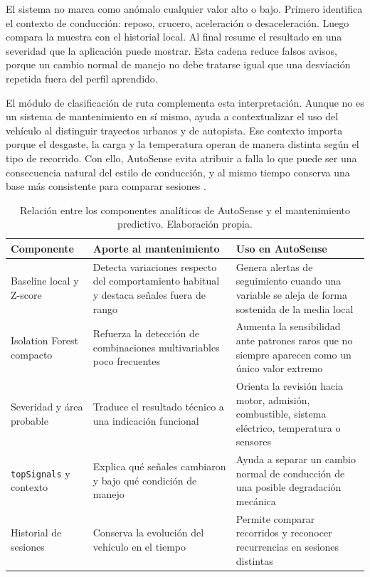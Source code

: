 \documentclass[12pt,letterpaper]{report}
\begin{document}
El sistema no marca como anómalo cualquier valor alto o bajo. Primero identifica el contexto de conducción: reposo, crucero, aceleración o desaceleración. Luego compara la muestra con el historial local. Al final resume el resultado en una severidad que la aplicación puede mostrar. Esta cadena reduce falsos avisos, porque un cambio normal de manejo no debe tratarse igual que una desviación repetida fuera del perfil aprendido.

El módulo de clasificación de ruta complementa esta interpretación. Aunque no es un sistema de mantenimiento en sí mismo, ayuda a contextualizar el uso del vehículo al distinguir trayectos urbanos y de autopista. Ese contexto importa porque el desgaste, la carga y la temperatura operan de manera distinta según el tipo de recorrido. Con ello, AutoSense evita atribuir a falla lo que puede ser una consecuencia natural del estilo de conducción, y al mismo tiempo conserva una base más consistente para comparar sesiones \cite{camposferreira2023_vehicle_driver_monitoring}.

\begin{table}[!htbp]
    \centering
    \caption{Relación entre los componentes analíticos de AutoSense y el mantenimiento predictivo. Elaboración propia.}
    \label{tab:autosense-predictive-maintenance}
    \renewcommand{\arraystretch}{1.08}
    \setlength{\tabcolsep}{4pt}
    \small
    \begin{tabular}{p{}p{}p{}}
    \toprule
    Componente & Aporte al mantenimiento & Uso en AutoSense \\
    \midrule
    Baseline local y Z-score & Detecta variaciones respecto del comportamiento habitual y destaca señales fuera de rango & Genera alertas de seguimiento cuando una variable se aleja de forma sostenida de la media local \\
    Isolation Forest compacto & Refuerza la detección de combinaciones multivariables poco frecuentes & Aumenta la sensibilidad ante patrones raros que no siempre aparecen como un único valor extremo \\
    Severidad y área probable & Traduce el resultado técnico a una indicación funcional & Orienta la revisión hacia motor, admisión, combustible, sistema eléctrico, temperatura o sensores \\
    \texttt{topSignals} y contexto & Explica qué señales cambiaron y bajo qué condición de manejo & Ayuda a separar un cambio normal de conducción de una posible degradación mecánica \\
    Historial de sesiones & Conserva la evolución del vehículo en el tiempo & Permite comparar recorridos y reconocer recurrencias en sesiones distintas \\
    \bottomrule
    \end{tabular}
\end{table}
\end{document}
